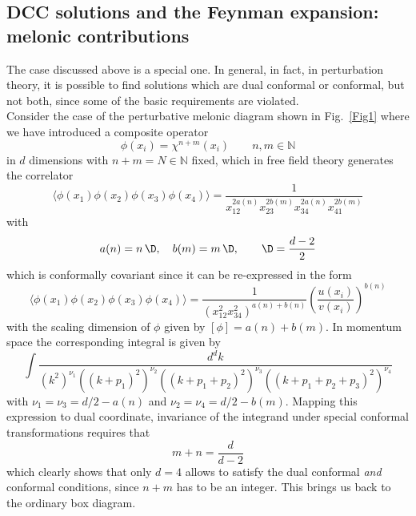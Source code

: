 \documentclass[a4paper,11pt,openright,twoside]{book}
\newcommand{\figref}[1]{Fig.~\ref{#1}}			%
\numberwithin{equation}{section}
\begin{document}
{\subsection{DCC solutions and the Feynman expansion: melonic contributions}
The case discussed above is a special one. In general, in fact, in perturbation theory,  it is possible to find solutions which are dual conformal or conformal, but not both, since some of the basic requirements are violated. \\
Consider the case of the perturbative melonic diagram shown in \figref{Fig1} where we have introduced a composite operator
\begin{equation}
	\phi(x_i)=\chi^{n+m}(x_i)  \qquad  n,m\in  \mathbb{N}
\end{equation}
in $d$ dimensions with $n+m=N\in\mathbb{N}$ fixed, which in free field theory generates the correlator 
\begin{equation}
	\langle \phi(x_1)\phi(x_2)\phi(x_3)\phi(x_4)\rangle = \frac{1}{x_{12}^{2 a(n)} x_{23}^{2 b(m)}x_{34}^{2 a(n) }x_{41}^{2 b(m)}}
\end{equation}
with
\begin{equation}
	a(n)=n \,\D,\quad b(m)=m \,\D,  \qquad \D= \frac{d-2}{2}
\end{equation}
which is conformally covariant since it can be re-expressed in the form 
\begin{equation}
	\langle \phi(x_1)\phi(x_2)\phi(x_3)\phi(x_4)\rangle = \frac{1}{\left(x_{12}^2 x_{34}^{2} \right)^{a(n) + b(n)}}\left( 
	\frac{u(x_i)}{v(x_i)}\right)^{b(n)}
\end{equation}
with the scaling dimension of $\phi$ given by $\left[\phi\right]= a(n) + b(m)$. In momentum space the corresponding integral is given by 
\begin{equation}
	\int \frac{d^d k}{(k^2)^{\nu_1} ((k+p_1)^2)^{\nu_2} ((k+p_1+p_2)^2)^{\nu_3} ((k+ p_1 + p_2+p_3)^2)^{\nu_4}}
\end{equation}
with $\nu_1=\nu_3=d/2-a(n)$ and $\nu_2=\nu_4=d/2-b(m)$. Mapping this expression to dual coordinate, invariance of the integrand under special conformal transformations requires that 
\begin{equation}
	m+ n=\frac{d}{d-2}
\end{equation}
which clearly shows that only $d=4$ allows to satisfy the dual conformal {\em and} conformal conditions, since $n+m$ has to be an integer. This brings us back to the ordinary box diagram. 

}
\end{document}
